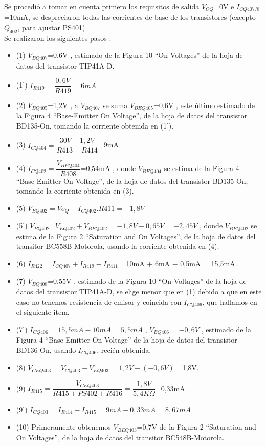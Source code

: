 \documentclass[12pt]{book}
\begin{document}
Se procedió a tomar en cuenta primero los requisitos de salida $V_{OQ}$=0V e $I_{CQ407/8}$=10mA, se despreciaron todas las corrientes de base de los transistores (excepto $Q_{402}$, para ajustar PS401)\\
Se realizaron los siguientes pasos :
\begin{itemize}
\item (1) $V_{BQ407}$=0,6V , estimado de la Figura 10 ``On Voltages'' de la hoja de datos del transistor TIP41A-D.
\item (1') $I_{R419}=\dfrac{0,6V}{R419}=6mA$
\item (2)  $V_{BQ405}$=1,2V , a $V_{BQ407}$ se suma $V_{BEQ405}$=0,6V , este último estimado de la Figura 4 ``Base-Emitter On Voltage'', de la hoja de datos del transistor BD135-On, tomando la corriente obtenida en (1').
\item (3) $I_{CQ404}=\dfrac{30V-1,2V}{R413+R414}$=9mA
\item (4) $I_{CQ402}=\dfrac{V_{BEQ404}}{R408}$=0,54mA , donde $V_{BEQ404}$ se estima de la Figura 4 ``Base-Emitter On Voltage'', de la hoja de datos del transistor BD135-On, tomando la corriente obtenida en (3).
\item (5) $V_{EQ402}=Vo_Q-I_{CQ402}.R411=-1,8V$
\item (5') $V_{BQ402}$=$V_{EQ402}+V_{BEQ402}=-1,8V-0,65V=-2,45V$ , donde $V_{BEQ402}$ se estima de la Figura 2 ``Saturation and On Voltages'', de la hoja de datos del transitor BC558B-Motorola, usando la corriente obtenida en (4).
\item (6) $I_{R422}=I_{CQ407}+I_{R419}-I_{R411}$= 10mA + 6mA $-$ 0,5mA = 15,5mA.
\item (7) $V_{BQ408}$=0,55V , estimado de la Figura 10 ``On Voltages'' de la hoja de datos del transistor TIP41A-D, se elige menor que en (1) debido a que en este caso no tenemos resistencia de emisor y coincida con $I_{CQ406}$, que hallamos en el siguiente item.
\item (7') $I_{CQ406}=15,5mA-10mA=5,5mA$ , $V_{BQ406}=-0,6V$ , estimado de la Figura 4 ``Base-Emitter On Voltage'' de la hoja de datos del transistor BD136-On, usando $I_{CQ406}$, recién obtenida.
\item (8) $V_{CEQ403}=V_{CQ403}-V_{EQ403}=1,2V-(-0,6V)$= 1,8V.
\item (9) $I_{R415}=\dfrac{V_{CEQ403}}{R415+PS402+R416}=\dfrac{1,8V}{5,4K\Omega}$=0,33mA.
\item (9') $I_{CQ403}=I_{R414}-I_{R415}=9mA-0,33mA=8,67mA$
\item (10) Primeramente obtenemos $V_{BEQ403}$=0,7V de la Figura 2 ``Saturation and On Voltages'', de la hoja de datos del transitor BC548B-Motorola.\\

\end{itemize}
\end{document}
